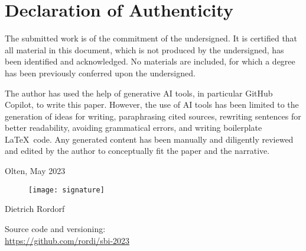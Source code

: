 \vspace*{3cm}

\section*{Declaration of Authenticity}

The submitted work is of the commitment of the undersigned. It is certified that all material
in this document, which is not produced by the undersigned, has been identified and acknowledged.
No materials are included, for which a degree has been previously conferred upon the undersigned.

\vspace*{0.5cm} 

\noindent The author has used the help of generative AI tools, in particular GitHub Copilot, to
write this paper. However, the use of AI tools has been limited to the generation of ideas for
writing, paraphrasing cited sources, rewriting sentences for better readability, avoiding grammatical
errors, and writing boilerplate \LaTeX\ code. Any generated content has been manually and diligently
reviewed and edited by the author to conceptually fit the paper and the narrative.

\vspace*{1cm} 
\noindent Olten, May 2023

\begin{figure}[h!]
    \texttt{[image: signature]}
\end{figure}
\noindent Dietrich Rordorf

\vspace*{2cm} 

\noindent Source code and versioning:\\
\url{https://github.com/rordi/sbi-2023}

